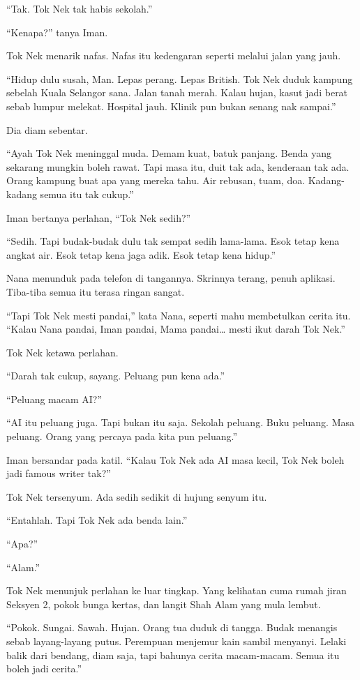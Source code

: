 \documentclass[
  11pt,
  a5paper,
  openany,
  oneside]{book}
\begin{document}
``Tak. Tok Nek tak habis sekolah.''

``Kenapa?'' tanya Iman.

Tok Nek menarik nafas. Nafas itu kedengaran seperti melalui jalan yang
jauh.

``Hidup dulu susah, Man. Lepas perang. Lepas British. Tok Nek duduk
kampung sebelah Kuala Selangor sana. Jalan tanah merah. Kalau hujan,
kasut jadi berat sebab lumpur melekat. Hospital jauh. Klinik pun bukan
senang nak sampai.''

Dia diam sebentar.

``Ayah Tok Nek meninggal muda. Demam kuat, batuk panjang. Benda yang
sekarang mungkin boleh rawat. Tapi masa itu, duit tak ada, kenderaan tak
ada. Orang kampung buat apa yang mereka tahu. Air rebusan, tuam, doa.
Kadang-kadang semua itu tak cukup.''

Iman bertanya perlahan, ``Tok Nek sedih?''

``Sedih. Tapi budak-budak dulu tak sempat sedih lama-lama. Esok tetap
kena angkat air. Esok tetap kena jaga adik. Esok tetap kena hidup.''

Nana menunduk pada telefon di tangannya. Skrinnya terang, penuh
aplikasi. Tiba-tiba semua itu terasa ringan sangat.

``Tapi Tok Nek mesti pandai,'' kata Nana, seperti mahu membetulkan
cerita itu. ``Kalau Nana pandai, Iman pandai, Mama pandai\ldots{} mesti
ikut darah Tok Nek.''

Tok Nek ketawa perlahan.

``Darah tak cukup, sayang. Peluang pun kena ada.''

``Peluang macam AI?''

``AI itu peluang juga. Tapi bukan itu saja. Sekolah peluang. Buku
peluang. Masa peluang. Orang yang percaya pada kita pun peluang.''

Iman bersandar pada katil. ``Kalau Tok Nek ada AI masa kecil, Tok Nek
boleh jadi famous writer tak?''

Tok Nek tersenyum. Ada sedih sedikit di hujung senyum itu.

``Entahlah. Tapi Tok Nek ada benda lain.''

``Apa?''

``Alam.''

Tok Nek menunjuk perlahan ke luar tingkap. Yang kelihatan cuma rumah
jiran Seksyen 2, pokok bunga kertas, dan langit Shah Alam yang mula
lembut.

``Pokok. Sungai. Sawah. Hujan. Orang tua duduk di tangga. Budak menangis
sebab layang-layang putus. Perempuan menjemur kain sambil menyanyi.
Lelaki balik dari bendang, diam saja, tapi bahunya cerita macam-macam.
Semua itu boleh jadi cerita.''
\end{document}
